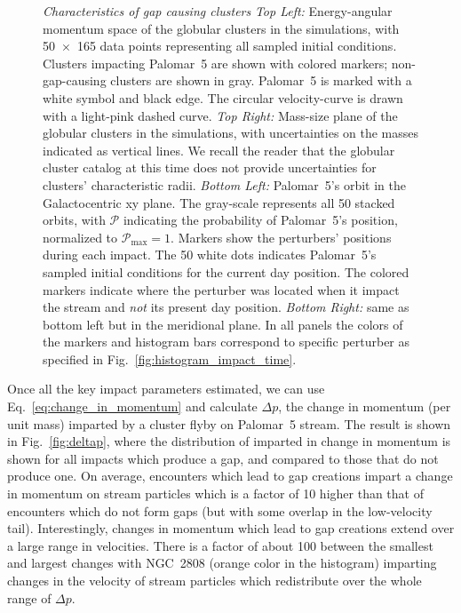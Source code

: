 \documentclass[draft]{aa}
\begin{document}
\begin{figure}
      \caption{\textit{Characteristics of gap causing clusters} \textit{Top Left:} Energy-angular momentum space of the globular clusters in the simulations, with 50~$\times$~165 data points representing all sampled initial conditions. Clusters impacting Palomar~5 are shown with colored markers; non-gap-causing clusters are shown in gray. Palomar~5 is marked with a white symbol and black edge. The circular velocity-curve is drawn with a light-pink dashed curve. \textit{Top Right:} Mass-size plane of the globular clusters in the simulations, with uncertainties on the masses indicated as vertical lines. We recall the reader that the globular cluster catalog at this time does not provide uncertainties for clusters' characteristic radii. \textit{Bottom Left:} Palomar~5's orbit in the Galactocentric xy plane. The gray-scale represents all 50 stacked orbits, with $\mathcal{P}$ indicating the probability of  Palomar~5's position, normalized to $\mathcal{P}_\textrm{max}=1$. Markers show the perturbers' positions during each impact. The 50 white dots indicates Palomar~5's sampled initial conditions for the current day position. The colored markers indicate where the perturber was located when it impact the stream and \textit{not} its present day position. \textit{Bottom Right:} same as bottom left but in the meridional plane. In all panels the colors of the markers and histogram bars correspond to specific perturber as specified in Fig.~\ref{fig:histogram_impact_time}.}
      \label{fig:mass_size_plane}
    \end{figure}

      
    Once all the key impact parameters estimated, we can use Eq.~\ref{eq:change_in_momentum} and calculate $\Delta p$, the change in momentum (per unit mass) imparted by a cluster flyby on Palomar~5 stream. The result  is shown in Fig.~\ref{fig:deltap}, where the distribution of imparted in change in momentum is shown for all impacts which produce a gap, and compared to those that do not produce one. On average, encounters which lead to gap creations impart a change in momentum on stream particles which is a factor of 10 higher than that of encounters which do not form gaps (but with some overlap in the low-velocity tail). Interestingly, changes in momentum which lead to gap creations extend over a large range in velocities. There is a factor of about 100 between the smallest and largest changes with NGC~2808 (orange color in the histogram) imparting changes in the velocity of stream particles which redistribute over the whole range of $\Delta p$. 
\end{document}
